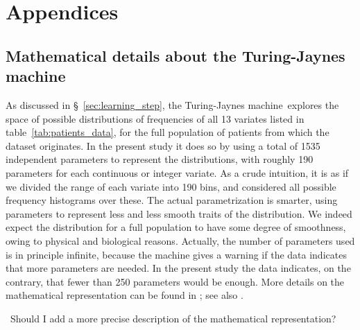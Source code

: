 \documentclass[utf8]{FrontiersinHarvard} %
\newcommand*{\pencil}{{\fontencoding{U}\fontfamily{fontawesometwo}\selectfont\symbol{210}}}
\newcommand{\mynotep}[1]{{\color{notecolour}\pencil\ #1}}
\newcommand*{\sect}{\S}%
\renewcommand*{\|}[1][]{\nonscript\:#1\vert\nonscript\:\mathopen{}}
\newcommand*{\tjm}{Turing-Jaynes machine}
\begin{document}
\appendix
\renewcommand\thesection{\Alph{section}}
\section{Appendices}
\label{sec:appendices}

\subsection{Mathematical details about the \tjm}
\label{sec:maths_tjm}


As discussed in \sect~\ref{sec:learning_step}, the \tjm\ explores the space of possible distributions of frequencies of all 13 variates listed in table~\ref{tab:patients_data}, for the full population of patients from which the dataset originates. In the present study it does so by using a total of 1535 independent parameters to represent the distributions, with roughly 190 parameters for each continuous or integer variate. As a crude intuition, it is as if we divided the range of each variate into 190 bins, and considered all possible frequency histograms over these. The actual parametrization is smarter, using parameters to represent less and less smooth traits of the distribution. We indeed expect the distribution for a full population to have some degree of smoothness, owing to physical and biological reasons. Actually, the number of parameters used is in principle infinite, because the machine gives a warning if the data indicates that more parameters are needed. In the present study the data indicates, on the contrary, that fewer than 250 parameters would be enough. More details on the mathematical representation can be found in \cite{dunsonetal2011}; see also \cite{rossi2014,rasmussen1999}.

\mynotep{Should I add a more precise description of the mathematical representation?}
\end{document}
